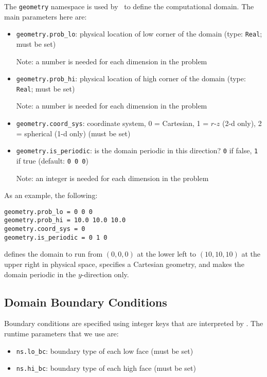 The {\tt geometry} namespace is used by \amrex\ to define the
computational domain.  The main parameters here are:
\begin{itemize}
\item {\tt geometry.prob\_lo}: physical location of low corner of the
domain (type: {\tt Real}; must be set)

  Note: a number is needed for each dimension in the problem
  
\item {\tt geometry.prob\_hi}: physical location of high corner of the
domain (type: {\tt Real}; must be set)

  Note: a number is needed for each dimension in the problem
  
\item {\tt geometry.coord\_sys}: coordinate system, 0 = Cartesian,
1 = $r$-$z$ (2-d only), 2 = spherical (1-d only) (must be set)

\item {\tt geometry.is\_periodic}: is the domain periodic in this direction?
  {\tt 0} if false, {\tt 1} if true  (default: {\tt 0 0 0}) 

  Note: an integer is needed for each dimension in the problem

\end{itemize}

As an example, the following:
\begin{lstlisting}
geometry.prob_lo = 0 0 0
geometry.prob_hi = 10.0 10.0 10.0
geometry.coord_sys = 0 
geometry.is_periodic = 0 1 0 
\end{lstlisting}
defines the domain to run from $(0,0,0)$ at the lower left to
$(10,10,10)$ at the upper right in physical space, specifies a
Cartesian geometry, and makes the domain periodic in the $y$-direction
only.

\subsection{Domain Boundary Conditions}

Boundary conditions are specified using integer keys that are interpreted
by \amrex.  The runtime parameters that we use are:
\begin{itemize}
\item {\tt ns.lo\_bc}: boundary type of each low face  (must be set)
\item {\tt ns.hi\_bc}: boundary type of each high face (must be set)
\end{itemize}

